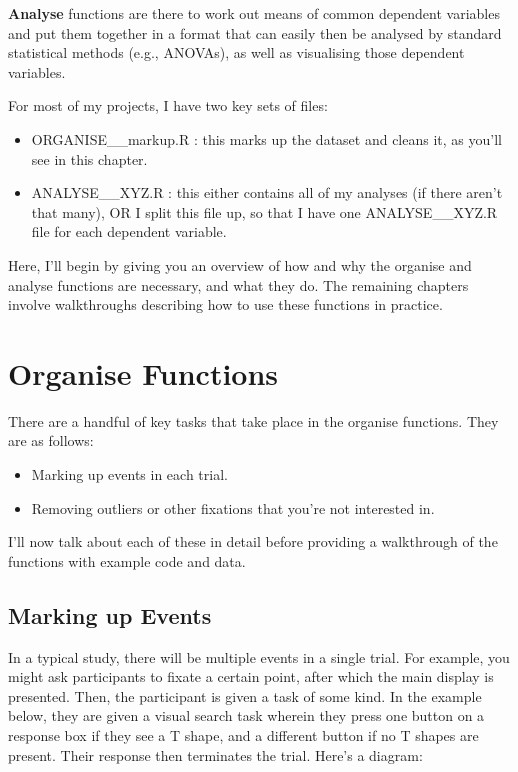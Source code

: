 \documentclass[]{book}
\providecommand{\tightlist}{%
  \setlength{\itemsep}{0pt}\setlength{\parskip}{0pt}}
\begin{document}
\textbf{Analyse} functions are there to work out means of common dependent variables and put them together in a format that can easily then be analysed by standard statistical methods (e.g., ANOVAs), as well as visualising those dependent variables.

For most of my projects, I have two key sets of files:

\begin{itemize}
\tightlist
\item
  ORGANISE\_\_markup.R : this marks up the dataset and cleans it, as you'll see in this chapter.
\item
  ANALYSE\_\_XYZ.R : this either contains all of my analyses (if there aren't that many), OR I split this file up, so that I have one ANALYSE\_\_XYZ.R file for each dependent variable.
\end{itemize}

Here, I'll begin by giving you an overview of how and why the organise and analyse functions are necessary, and what they do. The remaining chapters involve walkthroughs describing how to use these functions in practice.

\hypertarget{organise-functions}{%
\section{Organise Functions}\label{organise-functions}}

There are a handful of key tasks that take place in the organise functions. They are as follows:

\begin{itemize}
\tightlist
\item
  Marking up events in each trial.
\item
  Removing outliers or other fixations that you're not interested in.
\end{itemize}

I'll now talk about each of these in detail before providing a walkthrough of the functions with example code and data.

\hypertarget{marking-up-events}{%
\subsection{Marking up Events}\label{marking-up-events}}

In a typical study, there will be multiple events in a single trial. For example, you might ask participants to fixate a certain point, after which the main display is presented. Then, the participant is given a task of some kind. In the example below, they are given a visual search task wherein they press one button on a response box if they see a T shape, and a different button if no T shapes are present. Their response then terminates the trial. Here's a diagram:
\end{document}

